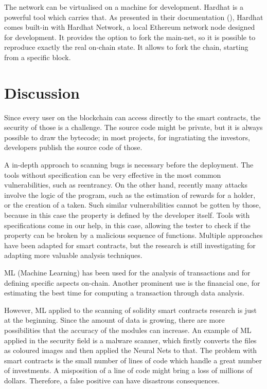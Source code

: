\documentclass[a4paper,sigconf, language=french,
language=german, language=spanish, language=english]{acmart}
\begin{document}
The network can be virtualised on a machine for development. Hardhat is a powerful tool which carries that. As presented in their documentation (\cite{Hardhat}), Hardhat comes built-in with Hardhat Network, a local Ethereum network node designed for development. It provides the option to fork the main-net, so it is possible to reproduce exactly the real on-chain state. It allows to fork the chain, starting from a specific block.


\section{Discussion}
\label{Discussion}

Since every user on the blockchain can access directly to the smart contracts, the security of those is a challenge. The source code might be private, but it is always possible to draw the bytecode; in most projects, for ingratiating the investors, developers publish the source code of those.  

A in-depth approach to scanning bugs is necessary before the deployment. The tools without specification can be very effective in the most common vulnerabilities, such as reentrancy. On the other hand, recently many attacks involve the logic of the program, such as the estimation of rewards for a holder, or the creation of a taken. Such similar vulnerabilities cannot be gotten by those, because in this case the property is defined by the developer itself. Tools with specifications come in our help, in this case, allowing the tester to check if the property can be broken by a malicious sequence of functions. Multiple approaches have been adapted for smart contracts, but the research is still investigating for adapting more valuable analysis techniques.

ML (Machine Learning) has been used for the analysis of transactions and for defining specific aspects on-chain. Another prominent use is the financial one, for estimating the best time for computing a transaction through data analysis.

However, ML applied to the scanning of solidity smart contracts research is just at the beginning. Since the amount of data is growing, there are more possibilities that the accuracy of the modules can increase.  An example of ML applied in the security field is a malware scanner, which firstly converts the files as coloured images and then applied the Neural Nets to that. The problem with smart contracts is the small number of lines of code which handle a great number of investments. A misposition of a line of code might bring a loss of millions of dollars. Therefore, a false positive can have disastrous consequences.
\end{document}
